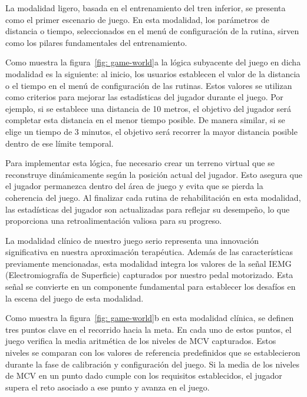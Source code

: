 La modalidad ligero, basada en el entrenamiento del tren inferior, se presenta como el primer escenario de juego. En esta modalidad, los parámetros de distancia o tiempo, seleccionados en el menú de configuración de la rutina, sirven como los pilares fundamentales del entrenamiento.

Como muestra la figura~\ref{fig: game-world}a la lógica subyacente del juego en dicha modalidad es la siguiente: al inicio, los usuarios establecen el valor de la distancia o el tiempo en el menú de configuración de las rutinas. Estos valores se utilizan como criterios para mejorar las estadísticas del jugador durante el juego. Por ejemplo, si se establece una distancia de 10 metros, el objetivo del jugador será completar esta distancia en el menor tiempo posible. De manera similar, si se elige un tiempo de 3 minutos, el objetivo será recorrer la mayor distancia posible dentro de ese límite temporal.

Para implementar esta lógica, fue necesario crear un terreno virtual que se reconstruye dinámicamente según la posición actual del jugador. Esto asegura que el jugador permanezca dentro del área de juego y evita que se pierda la coherencia del juego. Al finalizar cada rutina de rehabilitación en esta modalidad, las estadísticas del jugador son actualizadas para reflejar su desempeño, lo que proporciona una retroalimentación valiosa para su progreso.

La modalidad clínico de nuestro juego serio representa una innovación significativa en nuestra aproximación terapéutica. Además de las características previamente mencionadas, esta modalidad integra los valores de la señal IEMG (Electromiografía de Superficie) capturados por nuestro pedal motorizado. Esta señal se convierte en un componente fundamental para establecer los desafíos en la escena del juego de esta modalidad.

Como muestra la figura~\ref{fig: game-world}b en esta modalidad clínica, se definen tres puntos clave en el recorrido hacia la meta. En cada uno de estos puntos, el juego verifica la media aritmética de los niveles de MCV capturados. Estos niveles se comparan con los valores de referencia predefinidos que se establecieron durante la fase de calibración y configuración del juego. Si la media de los niveles de MCV en un punto dado cumple con los requisitos establecidos, el jugador supera el reto asociado a ese punto y avanza en el juego.

